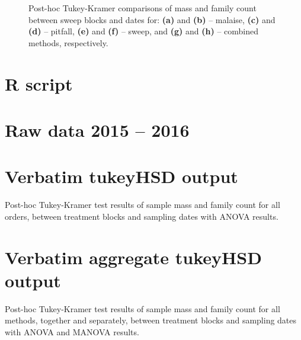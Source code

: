 \documentclass[10pt,letterpaper,twocolumn]{article}
\begin{document}
\begin{figure}[h]
\begin{subfigure}[b]{0.045\textwidth}
		\label{fig:bulk_family_tukey}
	\end{subfigure}
	\caption{Post-hoc Tukey-Kramer comparisons of mass and family count between sweep blocks and dates for: \textbf{(a)} and \textbf{(b)} -- malaise, \textbf{(c)} and \textbf{(d)} -- pitfall, \textbf{(e)} and \textbf{(f)} -- sweep, and \textbf{(g)} and \textbf{(h)} -- combined methods, respectively.}
	\label{fig:sweep_family_tukey}
	\smallskip
	\nointerlineskip
	\hrulefill
\end{figure}

\newpage

\appendix

\onecolumn
\section{R script}
\bigskip
\small
\lstset{numbers=left}


\newpage

\section{Raw data 2015 -- 2016}
\bigskip
\small
{}


\newpage

\section{Verbatim tukeyHSD output}
Post-hoc Tukey-Kramer test results of sample mass and family count for all orders, between treatment blocks and sampling dates with ANOVA results.

\bigskip
\small
{}


\section{Verbatim aggregate tukeyHSD output}
Post-hoc Tukey-Kramer test results of sample mass and family count for all methods, together and separately, between treatment blocks and sampling dates with ANOVA and MANOVA results.

\bigskip
\small
{}

\end{document}
